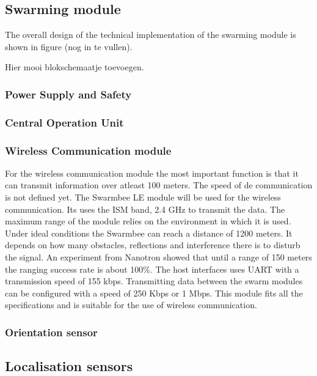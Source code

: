 \documentclass[10pt,a4paper]{article}
\begin{document}
\subsection{Swarming module}

The overall design of the technical implementation of the swarming module is shown in figure (nog in te vullen). 

Hier mooi blokschemaatje toevoegen. 


\subsubsection{Power Supply and Safety}

\subsubsection{Central Operation Unit}

\subsubsection{Wireless Communication module}

For the wireless communication module the most important function is that it can transmit information over atleast 100 meters. The speed of de communication is not defined yet. The Swarmbee LE module will be used for the wireless communication. Its uses the ISM band, 2.4 GHz to transmit the data. The maximum range of the module relies on the environment in which it is used. Under ideal conditions the Swarmbee can reach a distance of 1200 meters. It depends on how many obstacles, reflections and interference there is to disturb the signal. An experiment from Nanotron showed that until a range of 150 meters the ranging success rate is about 100\%. The host interfaces uses UART with a transmission speed of 155 kbps. Transmitting data between the swarm modules can be configured with a speed of 250 Kbps or 1 Mbps. This module fits all the specifications and is suitable for the use of wireless communication. 


\subsubsection{Orientation sensor}

\subsection{Localisation sensors}
\end{document}
